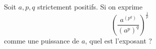 Soit $a, p, q$ strictement positifs. Si on exprime
\begin{displaymath}
 \left( \frac{a^{\left( p^q\right) }}{\left( a^p\right)^q }\right)^\frac{1}{p}
\end{displaymath}
comme une puissance de $a$, quel est l'exposant ?

\bigskip